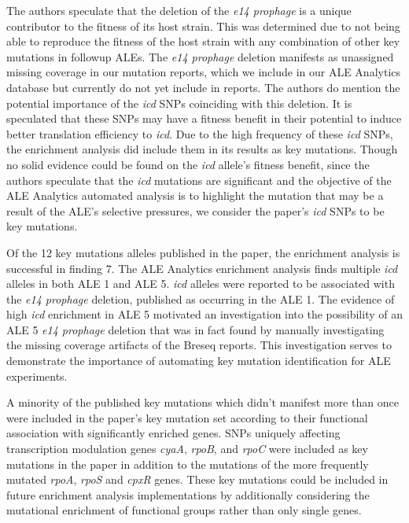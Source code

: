\documentclass[12pt,final,masters,chapterheads]{ucsd}  %
\begin{document}
The authors speculate that the deletion of the \textit{e14 prophage} is a unique contributor to the fitness of its host strain. This was determined due to not being able to reproduce the fitness of the host strain with any combination of other key mutations in followup ALEs. The \textit{e14 prophage} deletion manifests as unassigned missing coverage in our mutation reports, which we include in our ALE Analytics database but currently do not yet include in reports. The authors do mention the potential importance of the \textit{icd} SNPs coinciding with this deletion. It is speculated that these SNPs may have a fitness benefit in their potential to induce better translation efficiency to \textit{icd}. Due to the high frequency of these \textit{icd} SNPs, the enrichment analysis did include them in its results as key mutations. Though no solid evidence could be found on the \textit{icd} allele's fitness benefit, since the authors speculate that the \textit{icd} mutations are significant and the objective of the ALE Analytics automated analysis is to highlight the mutation that may be a result of the ALE's selective pressures, we consider the paper's \textit{icd} SNPs to be key mutations.

Of the 12 key mutations alleles published in the paper, the enrichment analysis is successful in finding 7. The ALE Analytics enrichment analysis finds multiple \textit{icd} alleles in both ALE 1 and ALE 5. \textit{icd} alleles were reported to be associated with the \textit{e14 prophage } deletion, published as occurring in the ALE 1. The evidence of high \textit{icd} enrichment in ALE 5 motivated an investigation into the possibility of an ALE 5 \textit{e14 prophage} deletion that was in fact found by manually investigating the missing coverage artifacts of the Breseq reports. This investigation serves to demonstrate the importance of automating key mutation identification for ALE experiments.

A minority of the published key mutations which didn't manifest more than once were included in the paper's key mutation set according to their functional association with significantly enriched genes. SNPs uniquely affecting transcription modulation genes \textit{cyaA}, \textit{rpoB}, and \textit{rpoC} were included as key mutations in the paper in addition to the mutations of the more frequently mutated \textit{rpoA}, \textit{rpoS} and \textit{cpxR} genes. These key mutations could be included in future enrichment analysis implementations by additionally considering the mutational enrichment of functional groups rather than only single genes.
\end{document}
